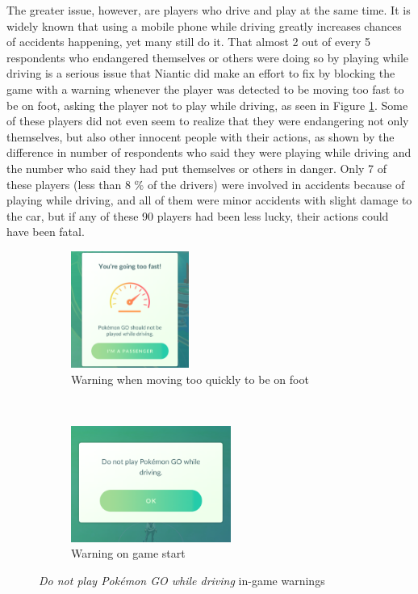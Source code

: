 The greater issue, however, are players who drive and play at the same time. It is widely known \cite{WHOphonedriving} that using a mobile phone while driving greatly increases chances of accidents happening, yet many still do it. That almost 2 out of every 5 respondents who endangered themselves or others were doing so by playing while driving is a serious issue that Niantic did make an effort to fix by blocking the game with a warning whenever the player was detected to be moving too fast to be on foot, asking the player not to play while driving, as seen in Figure \ref{fig:do-not-play-and-drive}. Some of these players did not even seem to realize that they were endangering not only themselves, but also other innocent people with their actions, as shown by the difference in number of respondents who said they were playing while driving and the number who said they had put themselves or others in danger. Only 7 of these players (less than 8 \% of the drivers) were involved in accidents because of playing while driving, and all of them were minor accidents with slight damage to the car, but if any of these 90 players had been less lucky, their actions could have been fatal.

\begin{figure}[h]
	\centering
	\begin{subfigure}[t]{0.4\textwidth}
		\centering
		\includegraphics[height=1.5in]{Figures/pogo-warning-driving}
		\caption{Warning when moving too quickly to be on foot}
	\end{subfigure}
	~
	\begin{subfigure}[t]{0.4\textwidth}
		\centering
		\includegraphics[height=1.5in]{Figures/pogo-warning-startup-driving}
		\caption{Warning on game start}
	\end{subfigure}
	\caption{\emph{Do not play Pokémon GO while driving} in-game warnings}
	\label{fig:do-not-play-and-drive}
\end{figure}

